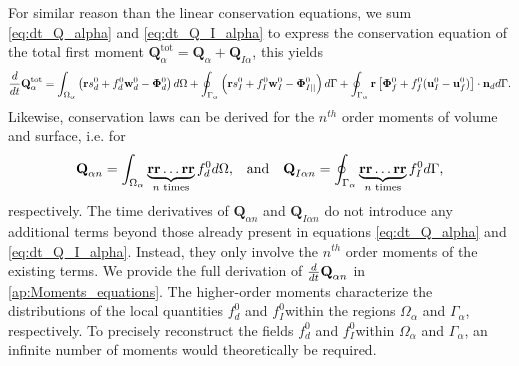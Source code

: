 For similar reason than the linear conservation equations, we sum \ref{eq:dt_Q_alpha} and \ref{eq:dt_Q_I_alpha} to express the conservation equation of the total first moment $\textbf{Q}_\alpha^\text{tot} = \textbf{Q}_\alpha + \textbf{Q}_{I\alpha}$, this yields 
\begin{multline}
    \frac{d}{dt} {\textbf{Q}_\alpha^\text{tot}}
    = \int_{\Omega_{\alpha}}  \left(
        \textbf{r} s_d^0         
        + f_d^0  \textbf{w}_d^0 
        - \mathbf{\Phi}_d^0
    \right)  d\Omega
    + \oint_{\Gamma_{\alpha}}  \left(
        \textbf{r}s_I^0
        + f_I^0 \textbf{w}_I^0
        - \mathbf{\Phi}_{I||}^0
    \right)  d\Gamma
    + \oint_{\Gamma_{\alpha}}  \textbf{r} \left[
        \mathbf{\Phi}_f^0
        + f_f^0 (\textbf{u}_I^0-\textbf{u}_f^0)
    \right]\cdot \textbf{n}_d   d\Gamma. 
    \label{eq:dt_Q_alpha_tot}
\end{multline}
Likewise, conservation laws can be derived for the $n^{th}$ order moments of volume and surface, i.e. for
\begin{align}
    \textbf{Q}_{\alpha n}
    = \int_{\Omega_{\alpha}} 
         \underbrace{\textbf{rr}\ldots \textbf{rr}}_{n\text{ times}}
        f_d^0  d\Omega,
        && \text{and} &&
    \textbf{Q}_{I\alpha n}
    = \oint_{\Gamma_{\alpha}} 
         \underbrace{\textbf{rr}\ldots \textbf{rr}}_{n\text{ times}}
    f_I^0  d\Gamma,
    \label{eq:Q_n_definition}
\end{align} 
respectively. The time derivatives of $\textbf{Q}_{\alpha n}$ and $\textbf{Q}_{I\alpha n}$ do not introduce any additional terms beyond those already present in equations \ref{eq:dt_Q_alpha} and \ref{eq:dt_Q_I_alpha}.
Instead, they only involve the $n^{th}$ order moments of the existing terms.
We provide the full derivation of $\frac{d}{dt}{ \textbf{Q}_{\alpha n}}$ in \ref{ap:Moments_equations}.
The higher-order moments characterize the distributions of the local quantities $f_d^0$ and $f_I^0$​ within the regions $\Omega_\alpha$ and $\Gamma_\alpha$​, respectively. 
To precisely reconstruct the fields $f_d^0$ and $f_I^0$​ within $\Omega_\alpha$ and $\Gamma_\alpha$​, an infinite number of moments would theoretically be required. 

